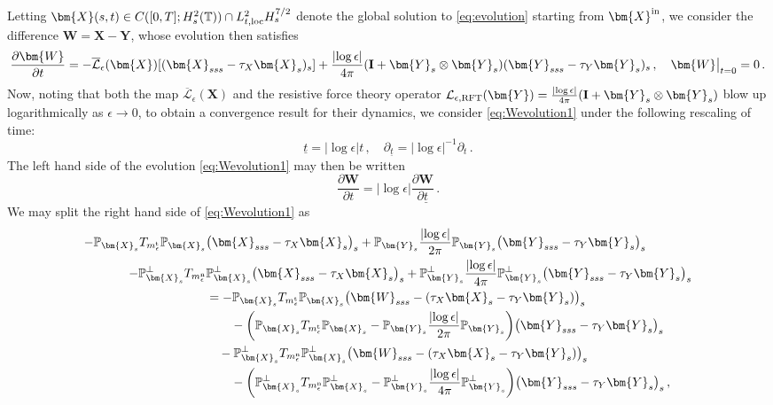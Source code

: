 \documentclass[11pt,reqno]{amsart}
\newcommand{\T}{\mathbb{T}}
\renewcommand{\P}{\mathbb{P}}
\newcommand{\X}{\bm{X}}
\newcommand{\Y}{\bm{Y}}
\newcommand{\p}{\partial}
\newcommand{\abs}[1]{\left\lvert #1 \right\rvert}
\newcommand{\mc}[1]{\mathcal{#1}}
\numberwithin{equation}{section}
\theoremstyle{definition}
\begin{document}
Letting $\X(s,t)\in C([0,T];H^2_s(\T))\cap L^2_{t,{\rm loc}}H^{7/2}_s$ denote the global solution to \eqref{eq:evolution} starting from $\X^{\rm in}$, we consider the difference $\bm{W}= \X-\Y$, whose evolution then satisfies 
\begin{equation}\label{eq:Wevolution1}
\begin{aligned}
  \frac{\p\bm{W}}{\p t} = -\overline{\mc{L}}_\epsilon(\X)[(\X_{sss}-\tau_X\X_s)_s]+ \frac{\abs{\log\epsilon}}{4\pi}({\bf I}+\Y_s\otimes\Y_s)(\Y_{sss}-\tau_Y\Y_s)_s\,, \quad \bm{W}\big|_{t=0}=0\,.
\end{aligned}
\end{equation}
%
%
Now, noting that both the map $\overline{\mc{L}}_\epsilon(\X)$ and the resistive force theory operator $\mc{L}_{\epsilon,\rm RFT}(\Y)=\frac{\abs{\log\epsilon}}{4\pi}({\bf I}+\Y_s\otimes\Y_s)$ blow up logarithmically as $\epsilon\to 0$, to obtain a convergence result for their dynamics, we consider \eqref{eq:Wevolution1} under the following rescaling of time:
\begin{equation}\label{eq:t_rescale}
  \underline{t} = \abs{\log\epsilon} t\,, \quad \p_{\underline t} = \abs{\log\epsilon}^{-1} \p_t\,.
\end{equation}
The left hand side of the evolution \eqref{eq:Wevolution1} may then be written
\begin{equation}
  \frac{\p\bm{W}}{\p t} = \abs{\log\epsilon}\frac{\p\bm{W}}{\p \underline t}\,.
\end{equation}
%
%
We may split the right hand side of \eqref{eq:Wevolution1} as
\begin{equation}
\begin{aligned}
  -\P_{\X_s}T_{m_\epsilon^{\rm t}}\P_{\X_s}&\big(\X_{sss}-\tau_X\X_s \big)_s  + \P_{\Y_s}\frac{\abs{\log\epsilon}}{2\pi}\P_{\Y_s}\big(\Y_{sss}-\tau_Y\Y_s \big)_s \\
   - \P_{\X_s}^\perp T_{m_\epsilon^{\rm n}}&\P_{\X_s}^\perp\big(\X_{sss}-\tau_X\X_s \big)_s+ \P_{\Y_s}^\perp\frac{\abs{\log\epsilon}}{4\pi}\P_{\Y_s}^\perp\big(\Y_{sss}-\tau_Y\Y_s \big)_s\\
  &= -\P_{\X_s}T_{m_\epsilon^{\rm t}}\P_{\X_s}\big(\bm{W}_{sss}-(\tau_X\X_s-\tau_Y\Y_s) \big)_s  \\
  &\qquad - \bigg(\P_{\X_s}T_{m_\epsilon^{\rm t}}\P_{\X_s}-\P_{\Y_s}\frac{\abs{\log\epsilon}}{2\pi}\P_{\Y_s}\bigg)\big(\Y_{sss}-\tau_Y\Y_s \big)_s\\
  &\quad - \P_{\X_s}^\perp T_{m_\epsilon^{\rm n}}\P_{\X_s}^\perp\big(\bm{W}_{sss}-(\tau_X\X_s-\tau_Y\Y_s) \big)_s\\
  &\qquad - \bigg(\P_{\X_s}^\perp T_{m_\epsilon^{\rm n}}\P_{\X_s}^\perp-\P_{\Y_s}^\perp\frac{\abs{\log\epsilon}}{4\pi}\P_{\Y_s}^\perp\bigg)\big(\Y_{sss}-\tau_Y\Y_s \big)_s\,,
\end{aligned}
\end{equation}
\end{document}
